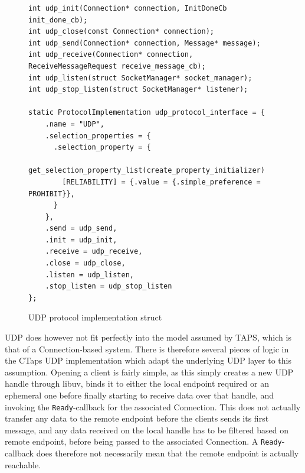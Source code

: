 \begin{figure}[H]
\begin{verbatim}
int udp_init(Connection* connection, InitDoneCb init_done_cb);
int udp_close(const Connection* connection);
int udp_send(Connection* connection, Message* message);
int udp_receive(Connection* connection, ReceiveMessageRequest receive_message_cb);
int udp_listen(struct SocketManager* socket_manager);
int udp_stop_listen(struct SocketManager* listener);

static ProtocolImplementation udp_protocol_interface = {
    .name = "UDP",
    .selection_properties = {
      .selection_property = {
        get_selection_property_list(create_property_initializer)
        [RELIABILITY] = {.value = {.simple_preference = PROHIBIT}},
      }
    },
    .send = udp_send,
    .init = udp_init,
    .receive = udp_receive,
    .close = udp_close,
    .listen = udp_listen,
    .stop_listen = udp_stop_listen
};
\end{verbatim}
\caption{UDP protocol implementation struct}
\end{figure} 

UDP does however not fit perfectly into the model assumed by
TAPS, which is that of a Connection-based system. There is therefore
several pieces of logic in the CTaps UDP implementation which adapt
the underlying UDP layer to this assumption. Opening a client is
fairly simple, as this simply creates a new UDP handle through
libuv, binds it to either the local endpoint required or an ephemeral one
before finally starting to receive data over that handle, and
invoking the \texttt{Ready}-callback for the associated Connection.
This does not actually transfer any data to the remote endpoint
before the clients sends its first message, and any data received
on the local handle has to be filtered based on remote endpoint,
before being passed to the associated Connection. 
A \texttt{Ready}-callback does therefore not necessarily
mean that the remote endpoint is actually reachable.


